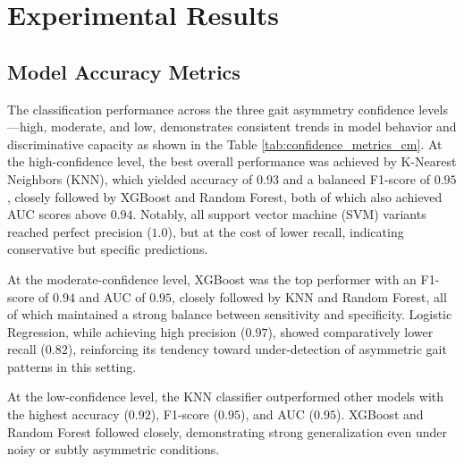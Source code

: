 \section{Experimental Results}
\label{sec:experimental_resuts}

\subsection{Model Accuracy Metrics}
The classification performance across the three gait asymmetry confidence levels—high, moderate, and low, demonstrates consistent trends in model behavior 
and discriminative capacity as shown in the Table \ref{tab:confidence_metrics_cm}. At the high-confidence level, the best overall performance was achieved by 
K-Nearest Neighbors (KNN), which yielded accuracy of $0.93$ and a balanced F1-score of $0.95$, closely followed by XGBoost and Random Forest, both of which also 
achieved AUC scores above $0.94$. Notably, all support vector machine (SVM) variants reached perfect precision ($1.0$), but at the cost of lower recall, indicating 
conservative but specific predictions.

At the moderate-confidence level, XGBoost was the top performer with an F1-score of $0.94$ and AUC of $0.95$, closely followed by KNN and Random 
Forest, all of which maintained a strong balance between sensitivity and specificity. Logistic Regression, while achieving high precision ($0.97$), showed 
comparatively lower recall ($0.82$), reinforcing its tendency toward under-detection of asymmetric gait patterns in this setting.

At the low-confidence level, the KNN classifier outperformed other models with the highest accuracy ($0.92$), F1-score ($0.95$), and AUC ($0.95$). 
XGBoost and Random Forest followed closely, demonstrating strong generalization even under noisy or subtly asymmetric conditions.

